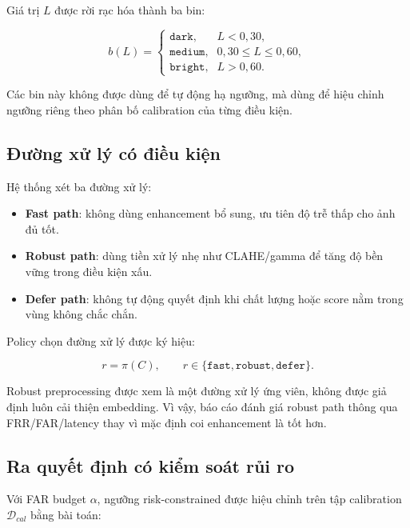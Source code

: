 Giá trị $L$ được rời rạc hóa thành ba bin:

\begin{equation}
    b(L)=
    \begin{cases}
        \texttt{dark},   & L < 0{,}30,\\
        \texttt{medium}, & 0{,}30 \leq L \leq 0{,}60,\\
        \texttt{bright}, & L > 0{,}60.
    \end{cases}
    \label{eq:bins}
\end{equation}

Các bin này không được dùng để tự động hạ ngưỡng, mà dùng để hiệu chỉnh ngưỡng riêng theo phân bố calibration của từng điều kiện.

\subsection{Đường xử lý có điều kiện}

Hệ thống xét ba đường xử lý:

\begin{itemize}
    \item \textbf{Fast path}: không dùng enhancement bổ sung, ưu tiên độ trễ thấp cho ảnh đủ tốt.
    \item \textbf{Robust path}: dùng tiền xử lý nhẹ như CLAHE/gamma để tăng độ bền vững trong điều kiện xấu.
    \item \textbf{Defer path}: không tự động quyết định khi chất lượng hoặc score nằm trong vùng không chắc chắn.
\end{itemize}

Policy chọn đường xử lý được ký hiệu:

\begin{equation}
    r = \pi(C), \qquad r \in \{\texttt{fast}, \texttt{robust}, \texttt{defer}\}.
    \label{eq:path_policy}
\end{equation}

Robust preprocessing được xem là một đường xử lý ứng viên, không được giả định luôn cải thiện embedding. Vì vậy, báo cáo đánh giá robust path thông qua FRR/FAR/latency thay vì mặc định coi enhancement là tốt hơn.

\subsection{Ra quyết định có kiểm soát rủi ro}

Với FAR budget $\alpha$, ngưỡng risk-constrained được hiệu chỉnh trên tập calibration $\mathcal{D}_{cal}$ bằng bài toán:

